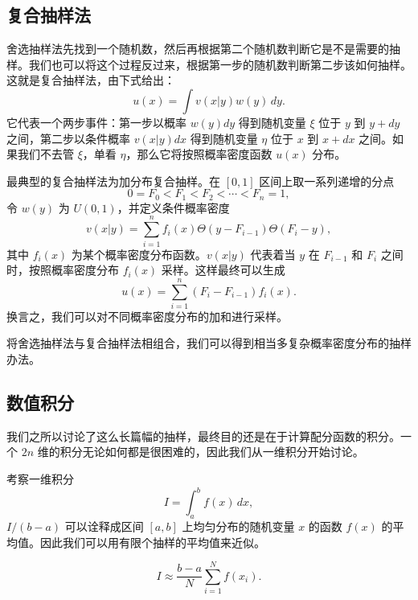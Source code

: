 \subsection{复合抽样法}

舍选抽样法先找到一个随机数，然后再根据第二个随机数判断它是不是需要的抽样。我们也可以将这个过程反过来，根据第一步的随机数判断第二步该如何抽样。这就是复合抽样法，由下式给出：
\begin{equation}
 u(x)=\int v(x|y)w(y)\,dy.
\tag{7.1.28}
\end{equation}
它代表一个两步事件：第一步以概率 $w(y)dy$ 得到随机变量 $\xi$ 位于 $y$ 到 $y+dy$ 之间，第二步以条件概率 $v(x|y)dx$ 得到随机变量 $\eta$ 位于 $x$ 到 $x+dx$ 之间。如果我们不去管 $\xi$，单看 $\eta$，那么它将按照概率密度函数 $u(x)$ 分布。

最典型的复合抽样法为加分布复合抽样。在 $[0,1]$ 区间上取一系列递增的分点
\begin{equation}
 0=F_0<F_1<F_2<\cdots<F_n=1,
\tag{7.1.29}
\end{equation}
令 $w(y)$ 为 $U(0,1)$，并定义条件概率密度
\begin{equation}
 v(x|y)=\sum_{i=1}^{n}f_i(x)\Theta(y-F_{i-1})\Theta(F_i-y),
\tag{7.1.30}
\end{equation}
其中 $f_i(x)$ 为某个概率密度分布函数。$v(x|y)$ 代表着当 $y$ 在 $F_{i-1}$ 和 $F_i$ 之间时，按照概率密度分布 $f_i(x)$ 采样。这样最终可以生成
\begin{equation}
 u(x)=\sum_{i=1}^{n}(F_i-F_{i-1})f_i(x).
\tag{7.1.31}
\end{equation}
换言之，我们可以对不同概率密度分布的加和进行采样。

将舍选抽样法与复合抽样法相组合，我们可以得到相当多复杂概率密度分布的抽样办法。

\subsection{数值积分}

我们之所以讨论了这么长篇幅的抽样，最终目的还是在于计算配分函数的积分。一个 $2n$ 维的积分无论如何都是很困难的，因此我们从一维积分开始讨论。

考察一维积分
\begin{equation}
 I=\int_a^b f(x)\,dx,
\tag{7.1.32}
\end{equation}
$I/(b-a)$ 可以诠释成区间 $[a,b]$ 上均匀分布的随机变量 $x$ 的函数 $f(x)$ 的平均值。因此我们可以用有限个抽样的平均值来近似。

\begin{algorithmBox}
\[
 I\approx\frac{b-a}{N}\sum_{i=1}^{N}f(x_i).
\]
\end{algorithmBox}


